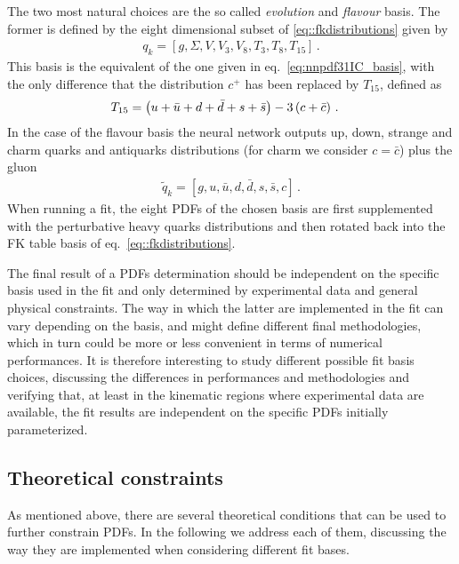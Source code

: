 %
The two most natural choices are the so called \textit{evolution} and \textit{flavour} basis.
The former is defined by the eight dimensional subset of \eqref{eq::fkdistributions} given by 
\begin{align}
    \label{eq:evolution_basis}
    q_k = \left[g, \Sigma, V, V_3, V_8, T_3, T_8, T_{15} \right]\,.
\end{align}
This basis is the equivalent of the one given in eq.~\eqref{eq:nnpdf31IC_basis}, with the only difference
that the distribution $c^+$ has been replaced by $T_{15}$, defined as 
\begin{align}
    T_{15}     &=  \left( u+\bar{u} +  d+\bar{d} +  s+\bar{s} \right) - 3\left(   c+\bar{c}\right) \, .
\end{align}
In the case of the flavour basis the neural network outputs   
up, down, strange and charm quarks and antiquarks distributions (for charm we consider $c=\bar{c}$) plus the gluon
\begin{align}
    \label{eq:flavour_basis}
	\tilde{q}_k = \left[g, u, \bar{u}, d, \bar{d}, s, \bar{s}, c\right]\,.
\end{align} 
When running a fit, the eight PDFs of the chosen basis are first supplemented with the perturbative heavy quarks
distributions and then rotated back into the FK table basis of eq.~\eqref{eq::fkdistributions}.

%
The final result of a PDFs determination should be independent on the specific basis used in the fit
and only determined by experimental data and general physical constraints.
The way in which the latter are implemented in the fit can vary depending on the basis,
and might define different final methodologies, which in turn could be more or less convenient
in terms of numerical performances. It is therefore interesting to study different possible
fit basis choices, discussing the differences in performances and methodologies and verifying that,
at least in the kinematic regions where experimental data are available, the 
fit results are independent on the specific PDFs initially parameterized.


\subsection{Theoretical constraints}
\label{sec:theory_constraints}

As mentioned above, there are several theoretical conditions that can be used to further constrain PDFs.
In the following we address each of them, discussing the way they are implemented when considering
different fit bases.

